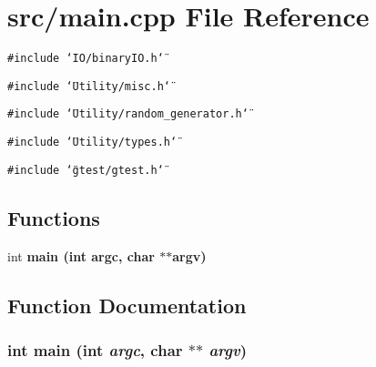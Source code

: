 \section{src/main.cpp File Reference}
\label{main_8cpp}
{\tt \#include \char`\"{}IO/binary\-IO.h\char`\"{}}\par
{\tt \#include \char`\"{}Utility/misc.h\char`\"{}}\par
{\tt \#include \char`\"{}Utility/random\_\-generator.h\char`\"{}}\par
{\tt \#include \char`\"{}Utility/types.h\char`\"{}}\par
{\tt \#include \char`\"{}gtest/gtest.h\char`\"{}}\par
\subsection*{Functions}
\begin{CompactItemize}
\item 
int \bf{main} (int argc, char $\ast$$\ast$argv)
\end{CompactItemize}


\subsection{Function Documentation}
\subsubsection{\setlength{\rightskip}{0pt plus 5cm}int main (int {\em argc}, char $\ast$$\ast$ {\em argv})}\label{main_8cpp_24e6ce6d053864cf5fb7af941457bb0e}


